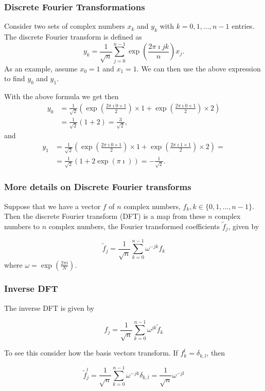 \documentclass{beamer}
\begin{document}
\begin{frame}
\frametitle{Discrete Fourier Transformations}

Consider two sets of complex numbers $x_k$ and $y_k$ with
$k=0,1,\dots,n-1$ entries. The discrete Fourier transform is defined
as
\[
y_k = \frac{1}{\sqrt{n}} \sum_{j=0}^{n-1} \exp{(\frac{2\pi\imath jk}{n})} x_j.
\]
As an example, assume $x_0=1$ and $x_1=1$. We can then use the above expression to find $y_0$ and $y_1$.

With the above formula we get then
\begin{align*}
y_0 &= \frac{1}{\sqrt{2}} \left( \exp{(\frac{2\pi\imath 0\times 1}{2})} \times 1+\exp{(\frac{2\pi\imath 0\times 1}{2})}\times 2\right)\\
& =\frac{1}{\sqrt{2}}(1+2)=\frac{3}{\sqrt{2}},
\end{align*}
and
\begin{align*}
y_1 &= \frac{1}{\sqrt{2}} \left( \exp{(\frac{2\pi\imath 0\times 1}{2})} \times 1+\exp{(\frac{2\pi\imath 1\times 1}{2})}\times 2\right)=\\
& =\frac{1}{\sqrt{2}}(1+2\exp{(\pi\imath)})=-\frac{1}{\sqrt{2}}.
\end{align*}
\end{frame}

\begin{frame}
\frametitle{More details on Discrete Fourier transforms}

Suppose that we have a vector $f$ of $n$ complex numbers, $f_{k}, k
\in\{0,1, \ldots, n-1\}$. Then the discrete Fourier transform (DFT) is
a map from these $n$ complex numbers to $n$ complex numbers, the
Fourier transformed coefficients $\tilde{f}_{j}$, given by

\begin{equation*}
\tilde{f}_{j}=\frac{1}{\sqrt{n}} \sum_{k=0}^{n-1} \omega^{-j k} f_{k}
\end{equation*}
where $\omega=\exp \left(\frac{2 \pi i}{N}\right)$.
\end{frame}

\begin{frame}
\frametitle{Inverse DFT}

The inverse DFT is given by

\begin{equation*}
f_{j}=\frac{1}{\sqrt{n}} \sum_{k=0}^{n-1} \omega^{j k} \tilde{f}_{k}
\end{equation*}

To see this consider how the basis vectors transform. If $f_{k}^{l}=\delta_{k, l}$, then

\begin{equation*}
\tilde{f}_{j}^{l}=\frac{1}{\sqrt{n}} \sum_{k=0}^{n-1} \omega^{-j k} \delta_{k, l}=\frac{1}{\sqrt{n}} \omega^{-j l}
\end{equation*}
\end{frame}
\end{document}
